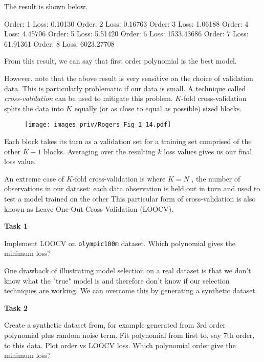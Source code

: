 \documentclass[a4paper,11pt]{article} %
\newcommand{\txtinline}[1]{\texttt{#1}}
\begin{document}
The result is shown below.
\begin{textcode}
Order:   1 Loss:    0.10130
Order:   2 Loss:    0.16763
Order:   3 Loss:    1.06188
Order:   4 Loss:    4.45706
Order:   5 Loss:    5.51420
Order:   6 Loss: 1533.43686
Order:   7 Loss:   61.91361
Order:   8 Loss: 6023.27708    
\end{textcode}
From this result, we can say that first order polynomial is the best model.

However, note that the above result is very sensitive on the choice of validation data.
This is particularly problematic if our data is small.
A technique called \emph{cross-validation} can be used to mitigate this problem.
$K$-fold cross-validation splits the data into $K$ equally (or as close to equal as
possible) sized blocks.

\begin{figure}[H]
\begin{center}
\texttt{[image: images\_priv/Rogers\_Fig\_1\_14.pdf]}
\end{center}
\end{figure}

Each block takes its turn as a
validation set for a training set comprised of the other $K−1$ blocks. Averaging over
the resulting $k$ loss values gives us our final loss value.

An extreme case of $K$-fold
cross-validation is where $K=N$ , the number of observations in our dataset: each
data observation is held out in turn and used to test a model trained on the other
This particular form of cross-validation is also known as Leave-One-Out
Cross-Validation (LOOCV).

\begin{mdframed}
\textbf{Task 1}

Implement LOOCV on \txtinline{olympic100m} dataset. Which polynomial gives the
minimum loss?
\end{mdframed}

One drawback of illustrating model selection on a real dataset is that we don’t
know what the "true" model is and therefore don’t know if our selection techniques
are working. We can overcome this by generating a synthetic dataset.

\begin{mdframed}
\textbf{Task 2}

Create a synthetic dataset from, for example generated from 3rd order
polynomial plus random noise term. Fit polynomial from first to, say 7th order,
to this data. Plot order vs LOOCV loss. Which polynomial order give the minimum loss?
\end{mdframed}
\end{document}
